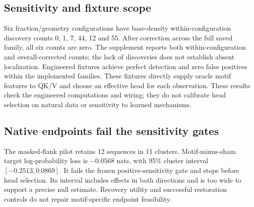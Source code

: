 \documentclass[10pt,letterpaper]{article}
\begin{document}
\subsection{Sensitivity and fixture scope}
Six fraction/geometry configurations have base-density within-configuration discovery counts 0, 1, 7, 44, 12 and 55. After correction across the full saved family, all six counts are zero. The supplement reports both within-configuration and overall-corrected counts; the lack of discoveries does not establish absent localization. Engineered fixtures achieve perfect detection and zero false positives within the implemented families. These fixtures directly supply oracle motif features to QK/V and choose an effective head for each observation. These results check the engineered computations and wiring; they do not calibrate head selection on natural data or sensitivity to learned mechanisms.
\subsection{Native endpoints fail the sensitivity gates}
The masked-flank pilot retains 12 sequences in 11 clusters. Motif-minus-sham target log-probability loss is $-0.0568$ nats, with 95\% cluster interval $[-0.2513,0.0869]$. It fails the frozen positive-sensitivity gate and stops before head selection. Its interval includes effects in both directions and is too wide to support a precise null estimate. Recovery utility and successful restoration controls do not repair motif-specific endpoint feasibility.
\end{document}
